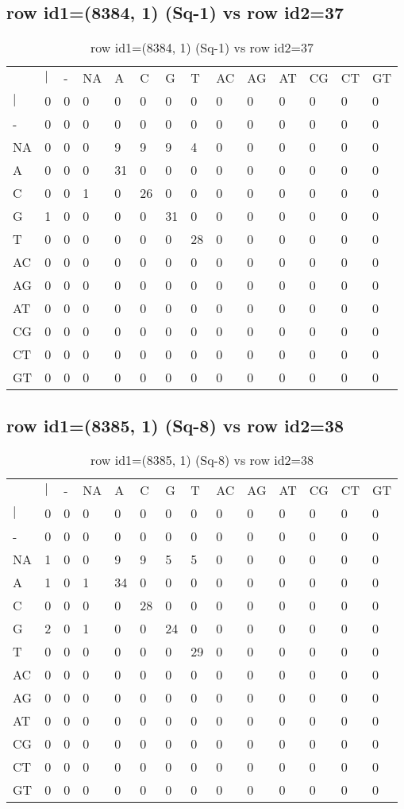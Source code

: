 \subsection{row id1=(8384, 1) (Sq-1) vs row id2=37}
\begin{center}
\begin{longtable}{|l|l|l|l|l|l|l|l|l|l|l|l|l|l|}
\caption{row id1=(8384, 1) (Sq-1) vs row id2=37} \label{table_dm436}\\
\hline
\\
\hline
&$|$&-&NA&A&C&G&T&AC&AG&AT&CG&CT&GT\\
$|$&0&0&0&0&0&0&0&0&0&0&0&0&0\\
-&0&0&0&0&0&0&0&0&0&0&0&0&0\\
NA&0&0&0&9&9&9&4&0&0&0&0&0&0\\
A&0&0&0&31&0&0&0&0&0&0&0&0&0\\
C&0&0&1&0&26&0&0&0&0&0&0&0&0\\
G&1&0&0&0&0&31&0&0&0&0&0&0&0\\
T&0&0&0&0&0&0&28&0&0&0&0&0&0\\
AC&0&0&0&0&0&0&0&0&0&0&0&0&0\\
AG&0&0&0&0&0&0&0&0&0&0&0&0&0\\
AT&0&0&0&0&0&0&0&0&0&0&0&0&0\\
CG&0&0&0&0&0&0&0&0&0&0&0&0&0\\
CT&0&0&0&0&0&0&0&0&0&0&0&0&0\\
GT&0&0&0&0&0&0&0&0&0&0&0&0&0\\
\hline
\end{longtable}
\end{center}

\subsection{row id1=(8385, 1) (Sq-8) vs row id2=38}
\begin{center}
\begin{longtable}{|l|l|l|l|l|l|l|l|l|l|l|l|l|l|}
\caption{row id1=(8385, 1) (Sq-8) vs row id2=38} \label{table_dm438}\\
\hline
\\
\hline
&$|$&-&NA&A&C&G&T&AC&AG&AT&CG&CT&GT\\
$|$&0&0&0&0&0&0&0&0&0&0&0&0&0\\
-&0&0&0&0&0&0&0&0&0&0&0&0&0\\
NA&1&0&0&9&9&5&5&0&0&0&0&0&0\\
A&1&0&1&34&0&0&0&0&0&0&0&0&0\\
C&0&0&0&0&28&0&0&0&0&0&0&0&0\\
G&2&0&1&0&0&24&0&0&0&0&0&0&0\\
T&0&0&0&0&0&0&29&0&0&0&0&0&0\\
AC&0&0&0&0&0&0&0&0&0&0&0&0&0\\
AG&0&0&0&0&0&0&0&0&0&0&0&0&0\\
AT&0&0&0&0&0&0&0&0&0&0&0&0&0\\
CG&0&0&0&0&0&0&0&0&0&0&0&0&0\\
CT&0&0&0&0&0&0&0&0&0&0&0&0&0\\
GT&0&0&0&0&0&0&0&0&0&0&0&0&0\\
\hline
\end{longtable}
\end{center}

